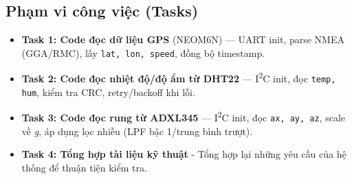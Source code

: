 \subsection*{Phạm vi công việc (Tasks)}
\begin{itemize}
  \item \textbf{Task 1: Code đọc dữ liệu GPS} (NEO\text{-}M6N) — UART init, parse NMEA (GGA/RMC), lấy \texttt{lat, lon, speed}, đồng bộ timestamp.
  \item \textbf{Task 2: Code đọc nhiệt độ/độ ẩm từ DHT22} — I\textsuperscript{2}C init, đọc \texttt{temp, hum}, kiểm tra CRC, retry/backoff khi lỗi.
  \item \textbf{Task 3: Code đọc rung từ ADXL345} — I\textsuperscript{2}C init, đọc \texttt{ax, ay, az}, scale về \textit{g}, áp dụng lọc nhiễu (LPF bậc 1/trung bình trượt).
  \item \textbf{Task 4: Tổng hợp tài liệu kỹ thuật} - Tổng hợp lại những yêu cầu của hệ thống để thuận tiện kiểm tra.
\end{itemize}